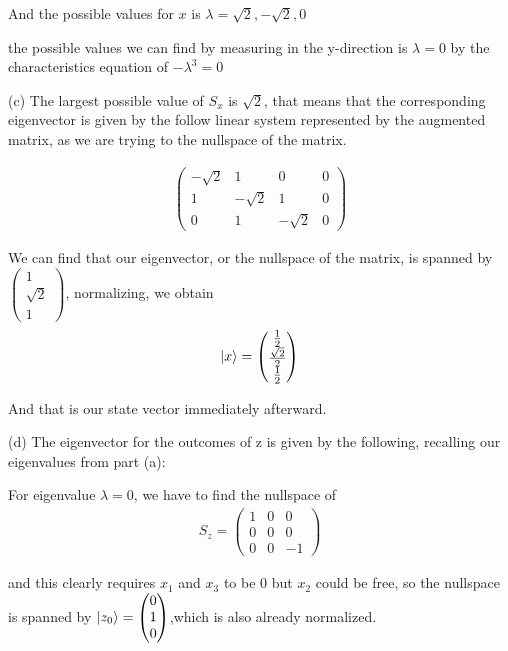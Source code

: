 \documentclass{article}
\begin{document}
And the possible values for $x$ is $\lambda = \sqrt{2}, - \sqrt{2}, 0$

the possible values we can find by measuring in the y-direction is $\lambda = 0$ by the characteristics equation of $-\lambda^3 = 0$

(c) The largest possible value of $S_x$ is $\sqrt{2}$, that means that the corresponding eigenvector is given by the follow linear system represented by the augmented matrix, as we are trying to the nullspace of the matrix.

\begin{align}
    \begin{pmatrix}
        -\sqrt{2} & 1 & 0 & 0 \\
        1 & -\sqrt{2} & 1 & 0 \\
        0 & 1 & -\sqrt{2} & 0
    \end{pmatrix}
\end{align}

We can find that our eigenvector, or the nullspace of the matrix, is spanned by $\begin{pmatrix}
    1 \\ \sqrt{2} \\ 1
\end{pmatrix}$, normalizing, we obtain 
\begin{align}
    \ket{x} = \begin{pmatrix}
    \frac{1}{2} \\ \frac{\sqrt{2}}{2} \\ \frac{1}{2}
\end{pmatrix}
\end{align}

And that is our state vector immediately afterward.

(d) The eigenvector for the outcomes of z is given by the following, recalling our eigenvalues from part (a):

For eigenvalue $\lambda = 0$, we have to find the nullspace of 
\begin{align}
        S_z = \begin{pmatrix}
        1 & 0 & 0 \\ 0 & 0 & 0 \\ 0 & 0 & -1
    \end{pmatrix}
\end{align}

and this clearly requires $x_1$ and $x_3$ to be 0 but $x_2$ could be free, so the nullspace is spanned by $\ket{z_0} = \begin{pmatrix}
    0 \\ 1 \\ 0
\end{pmatrix}$,which is also already normalized.
\end{document}
